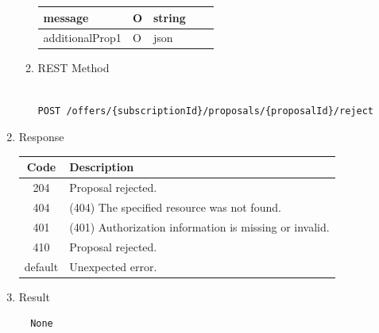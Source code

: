 \begin{enumerate}
\begin{enumerate}
\begin{table}[H]
\begin{center}
\begin{tabular}{|p{3cm}|l|p{3cm}|p{3cm}|p{4cm}|}
message				& O &	string 			&		& 		\\
\hline

additionalProp1 	& O &	json			&		& 		\\
\hline

\end{tabular}
\end{center}

\end{table}

\item REST Method

\begin{tcolorbox}[boxrule=0pt, frame empty]
\begin{verbatim} 

POST /offers/{subscriptionId}/proposals/{proposalId}/reject

\end{verbatim}
\end{tcolorbox}

\end{enumerate}

\item Response

\begin{table}[H]
\footnotesize

\begin{center}
\begin{tabular}{|c|l|} 
\hline
\rowcolor{lightgray}	Code 		& 	Description \\
\hline
204	 		&	Proposal rejected.  \\
\hline
404			&	(404) The specified resource was not found. \\
\hline
401			&	(401) Authorization information is missing or invalid. \\
\hline
410			&	Proposal rejected. \\
\hline
default		&	Unexpected error. \\
\hline
\end{tabular}
\end{center}

\end{table}

\item Result

\begin{tcolorbox}[boxrule=0pt, frame empty]
\begin{verbatim}
  None
\end{verbatim}
\end{tcolorbox}


\end{enumerate}
